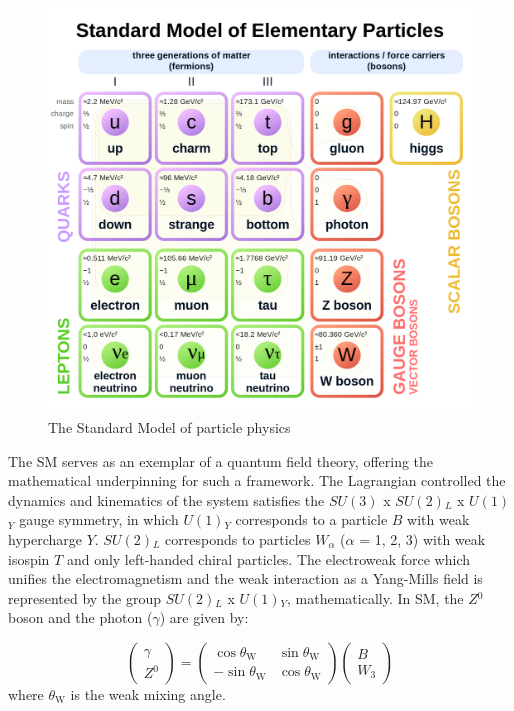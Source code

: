 \documentclass[UTF8,12pt]{ctexart}
\numberwithin{equation}{section}
\def\ga{\gamma}
\begin{document}
\begin{figure}[htb] 
	\centering  
	\includegraphics[width=14cm]{./fig/SM-p.png}
	\caption{The Standard Model of particle physics}
	\label{fig:SM}
\end{figure}

The SM  serves as an exemplar of a quantum field theory, offering the mathematical underpinning for such a framework. The Lagrangian controlled the dynamics and kinematics of the system satisfies the $SU(3)$ x $SU(2)$$_L$ x $U(1)$$_Y$ gauge symmetry, in which $U(1)$$_Y$ corresponds to a particle $B$ with weak hypercharge $Y$. $SU(2)$$_L$ corresponds to particles $W$$_\alpha$ ($\alpha$ = 1, 2, 3) with weak isospin $T$ and only left-handed chiral particles. The electroweak force which unifies the electromagnetism and the weak interaction as a Yang-Mills field is represented by the group $SU(2)$$_L$ x $U(1)$$_Y$, mathematically. In SM, the $Z$$^0$ boson and the photon ($\ga$) are given by: 

\begin{equation}
\left(\begin{array}{c}\gamma \\ Z^{0}\end{array}\right)=\left(\begin{array}{cc}\cos \theta_{\mathrm{W}} & \sin \theta_{\mathrm{W}} \\ -\sin \theta_{\mathrm{W}} & \cos \theta_{\mathrm{W}}\end{array}\right)\left(\begin{array}{c}B \\ W_{3}\end{array}\right)
\end{equation}
where $\theta_{\mathrm{W}}$ is the weak mixing angle. 
\end{document}
